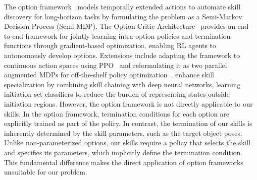 The option framework~\cite{sutton1999between, precup2000temporal} models temporally extended actions to automate skill discovery for long-horizon tasks by formulating the problem as a Semi-Markov Decision Process (Semi-MDP). The Option-Critic Architecture~\cite{bacon2017option} provides an end-to-end framework for jointly learning intra-option policies and termination functions through gradient-based optimization, enabling RL agents to autonomously develop options. Extensions include adapting the framework to continuous action spaces using PPO~\cite{klissarov2017learnings} and reformulating it as two parallel augmented MDPs for off-the-shelf policy optimization~\cite{zhang2019dac}. \citet{bagaria2019option} enhance skill specialization by combining skill chaining with deep neural networks, learning initiation set classifiers to reduce the burden of representing states outside initiation regions. %
However, the option framework is not directly applicable to our skills. In the option framework, termination conditions for each option are explicitly trained as part of the policy. In contrast, the termination of our skills is inherently determined by the skill parameters, such as the target object poses. Unlike non-parameterized options, our skills require a policy that selects the skill and specifies its parameters, which implicitly define the termination condition. This fundamental difference makes the direct application of option frameworks unsuitable for our problem.


